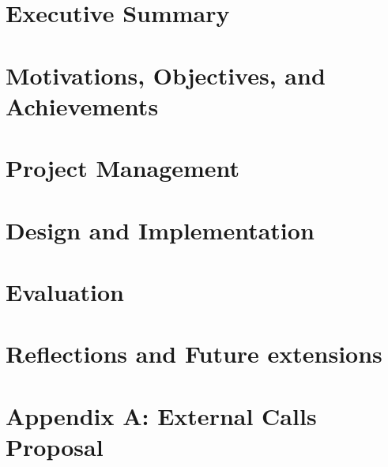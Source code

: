 \documentclass[12pt,twoside]{report}
\begin{document}


\clearpage{\pagestyle{empty}\cleardoublepage}
\setcounter{page}{1}
\pagestyle{fancy}

\tableofcontents
\clearpage{\pagestyle{empty}\cleardoublepage}
\setcounter{page}{1}
\fancyhead[LE,RO]{\slshape \rightmark}
\fancyhead[LO,RE]{\slshape \leftmark}

\chapter{Executive Summary}


\chapter{Motivations, Objectives, and Achievements}


\chapter{Project Management}


\chapter{Design and Implementation}
\label{chp:di}






\chapter{Evaluation}


\chapter{Reflections and Future extensions}


\printbibliography[heading=bibintoc]


\setcounter{chapter}{7}
\setcounter{section}{0}
\chapter*{Appendix A: External Calls Proposal}
\label{chp:appendix-a}

\end{document}
